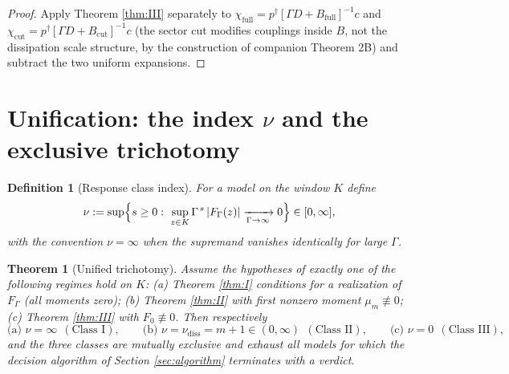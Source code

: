 \documentclass[11pt]{article}
\newtheorem{theorem}{Theorem}
\newtheorem{definition}{Definition}
\newcommand{\nudiss}{\nu_{\mathrm{diss}}}
\begin{document}
\begin{proof}
Apply Theorem \ref{thm:III} separately to
$\chi_{\mathrm{full}}=p^\dagger[\Gamma D+B_{\mathrm{full}}]^{-1}c$ and
$\chi_{\mathrm{cut}}=p^\dagger[\Gamma D+B_{\mathrm{cut}}]^{-1}c$ (the sector
cut modifies couplings inside $B$, not the dissipation scale structure, by the
construction of companion Theorem 2B) and subtract the two uniform expansions.
\end{proof}

\section{Unification: the index $\nu$ and the exclusive trichotomy}

\begin{definition}[Response class index]
\label{def:nu}
For a model on the window $K$ define
\[
\nu:=\sup\Bigl\{s\ge0:\ \sup_{z\in K}\Gamma^{\,s}\,|F_\Gamma(z)|
\xrightarrow[\Gamma\to\infty]{}0\Bigr\}
\in[0,\infty],
\]
with the convention $\nu=\infty$ when the supremand vanishes identically for
large $\Gamma$.
\end{definition}

\begin{theorem}[Unified trichotomy]
\label{thm:trichotomy}
Assume the hypotheses of exactly one of the following regimes hold on $K$:
(a) Theorem \ref{thm:I} conditions for a realization of $F_\Gamma$
(all moments zero); (b) Theorem \ref{thm:II} with first nonzero moment
$\mu_m\not\equiv0$; (c) Theorem \ref{thm:III} with $F_0\not\equiv0$.
Then respectively
\[
\text{(a) } \nu=\infty\ \ (\text{Class I}),\qquad
\text{(b) } \nu=\nudiss=m+1\in(0,\infty)\ \ (\text{Class II}),\qquad
\text{(c) } \nu=0\ \ (\text{Class III}),
\]
and the three classes are mutually exclusive and exhaust all models for which
the decision algorithm of Section \ref{sec:algorithm} terminates with a
verdict.
\end{theorem}
\end{document}
